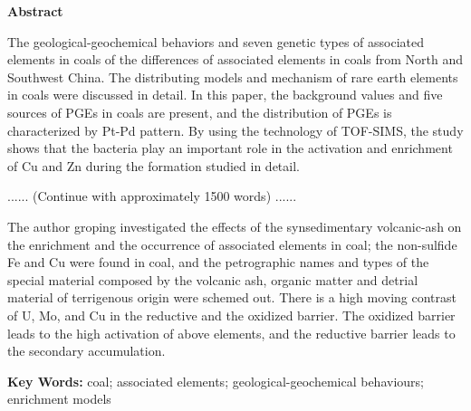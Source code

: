 \clearpage
{}
{}

\begin{center}
    \bfseries\selectfont
    \vspace*{12pt}
    Abstract
    \vspace*{6pt}
\end{center}

\begingroup
    \selectfont
    \setlength{\parindent}{2em}
    \setlength{\parskip}{0pt}
    
    The geological-geochemical behaviors and seven genetic types of associated elements in coals of the differences of associated elements in coals from North and Southwest China. The distributing models and mechanism of rare earth elements in coals were discussed in detail. In this paper, the background values and five sources of PGEs in coals are present, and the distribution of PGEs is characterized by Pt-Pd pattern. By using the technology of TOF-SIMS, the study shows that the bacteria play an important role in the activation and enrichment of Cu and Zn during the formation studied in detail.
    \par
    \vspace{\baselineskip}
    \centerline{...... (Continue with approximately 1500 words) ......}
    \par
    \vspace{\baselineskip}
    The author groping investigated the effects of the synsedimentary volcanic-ash on the enrichment and the occurrence of associated elements in coal; the non-sulfide Fe and Cu were found in coal, and the petrographic names and types of the special material composed by the volcanic ash, organic matter and detrial material of terrigenous origin were schemed out. There is a high moving contrast of U, Mo, and Cu in the reductive and the oxidized barrier. The oxidized barrier leads to the high activation of above elements, and the reductive barrier leads to the secondary accumulation.
    \par
\endgroup

\begingroup
    \textbf{Key Words: } coal; associated elements; geological-geochemical behaviours; enrichment models
\endgroup
\clearpage
